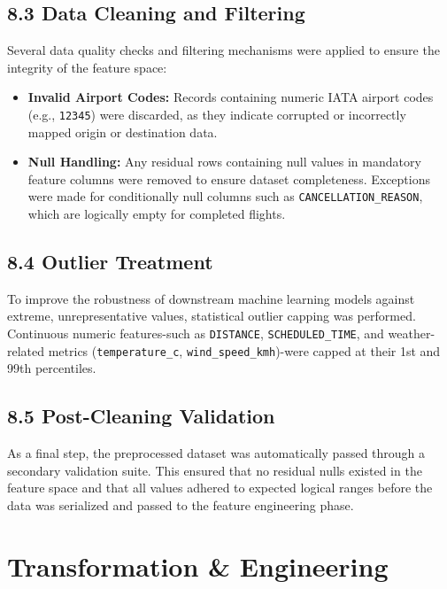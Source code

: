 \documentclass{article}
\begin{document}
\subsection*{\textcolor{accentgold}{8.3 Data Cleaning and Filtering}}
Several data quality checks and filtering mechanisms were applied to ensure the integrity of the feature space:
\begin{itemize}
    \item \textbf{Invalid Airport Codes:} Records containing numeric IATA airport codes (e.g., \texttt{12345}) were discarded, as they indicate corrupted or incorrectly mapped origin or destination data.
    \item \textbf{Null Handling:} Any residual rows containing null values in mandatory feature columns were removed to ensure dataset completeness. Exceptions were made for conditionally null columns such as \texttt{CANCELLATION\_REASON}, which are logically empty for completed flights.
\end{itemize}

\subsection*{\textcolor{accentgold}{8.4 Outlier Treatment}}
To improve the robustness of downstream machine learning models against extreme, unrepresentative values, statistical outlier capping was performed. Continuous numeric features-such as \texttt{DISTANCE}, \texttt{SCHEDULED\_TIME}, and weather-related metrics (\texttt{temperature\_c}, \texttt{wind\_speed\_kmh})-were capped at their 1st and 99th percentiles.

\subsection*{\textcolor{accentgold}{8.5 Post-Cleaning Validation}}
As a final step, the preprocessed dataset was automatically passed through a secondary validation suite. This ensured that no residual nulls existed in the feature space and that all values adhered to expected logical ranges before the data was serialized and passed to the feature engineering phase.

\newpage

\section{\textcolor{accentblue}{Transformation \& Engineering}}
\end{document}
